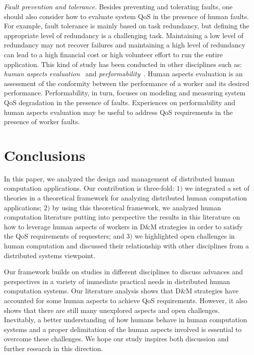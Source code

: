 \documentclass[11pt]{bmc_article_s50}
\begin{document}
\textit{Fault prevention and tolerance.} Besides preventing and tolerating faults, one should also consider how to evaluate system QoS in the presence of human faults. For example, fault tolerance is mainly based on task redundancy, but defining the appropriate level of redundancy is a challenging task. Maintaining a low level of redundancy may not recover failures and maintaining a high level of redundancy can lead to a high financial cost or high volunteer effort to run the entire application. This kind of study has been conducted in other disciplines such as: \textit{human aspects evaluation}~\cite{Whitefield:BehaviourInformationTechnology:1991} and \textit{performability}~\cite{misra2008handbook}. Human aspects evaluation is an assessment of the conformity between the performance of a worker and its desired performance. Performability, in turn, focuses on modeling and measuring system QoS degradation in the presence of faults. Experiences on performability and human aspects evaluation may be useful to address QoS requirements in the presence of worker faults.\vspace*{-5pt} 

\section{Conclusions}

In this paper, we analyzed the design and management of distributed human computation applications. Our contribution is three-fold: $1)$ we integrated a set of theories in a theoretical framework for analyzing distributed human computation applications; $2)$ by using this theoretical framework, we analyzed human computation literature putting into perspective the results in this literature on how to leverage human aspects of workers in D\&M strategies in order to satisfy the QoS requirements of requesters; and $3)$ we highlighted open challenges in human computation and discussed their relationship with other disciplines from a distributed systems viewpoint.

Our framework builds on studies in different disciplines to discuss advances and perspectives in a variety of immediate practical needs in distributed human computation systems. Our literature analysis shows that D\&M strategies have accounted for some human aspects to achieve QoS requirements. However, it also shows that there are still many unexplored aspects and open challenges. Inevitably, a better understanding of how humans behave in human computation systems and a proper delimitation of the human aspects involved is essential to overcome these challenges. We hope our study inspires both discussion and further research in this direction.\vspace*{-5pt} 
\end{document}
